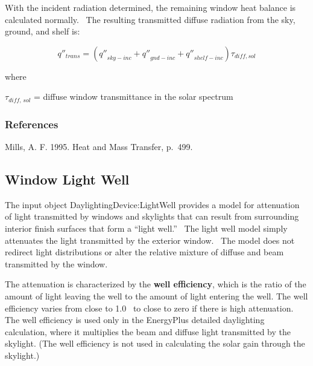 With the incident radiation determined, the remaining window heat balance is calculated normally.~ The resulting transmitted diffuse radiation from the sky, ground, and shelf is:

\begin{equation}
{q''_{trans}} = \left( {{{q''}_{sky - inc}} + {{q''}_{gnd - inc}} + {{q''}_{shelf - inc}}} \right){\tau_{diff,sol}}
\end{equation}

where

\(\tau_{diff,\, sol}\) = diffuse window transmittance in the solar spectrum

\subsubsection{References}\label{references-1-006}

Mills, A. F. 1995. Heat and Mass Transfer, p.~499.

\subsection{Window Light Well}\label{window-light-well}

The input object DaylightingDevice:LightWell provides a model for attenuation of light transmitted by windows and skylights that can result from surrounding interior finish surfaces that form a ``light well.''~ The light well model simply attenuates the light transmitted by the exterior window.~ The model does not redirect light distributions or alter the relative mixture of diffuse and beam transmitted by the window.

The attenuation is characterized by the \textbf{well efficiency}, which is the ratio of the amount of light leaving the well to the amount of light entering the well. The well efficiency varies from close to 1.0~ to close to zero if there is high attenuation. The well efficiency is used only in the EnergyPlus detailed daylighting calculation, where it multiplies the beam and diffuse light transmitted by the skylight. (The well efficiency is not used in calculating the solar gain through the skylight.)

